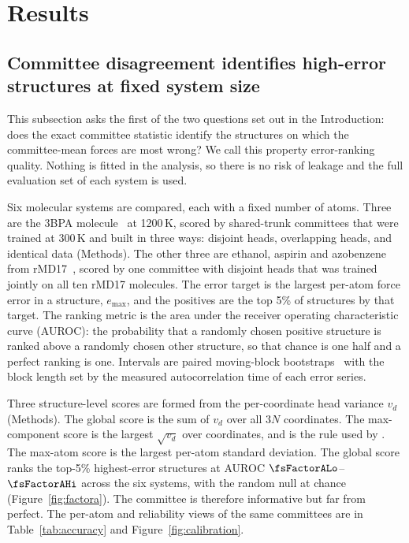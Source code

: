 
\section{Results}
\label{sec:results}


\subsection{Committee disagreement identifies high-error structures at fixed system size}
\label{sec:fixedsize}

This subsection asks the first of the two questions set out in the Introduction:
does the exact committee statistic identify the structures on which the
committee-mean forces are most wrong? We call this property error-ranking
quality. Nothing is fitted in the analysis, so there is no risk of leakage and
the full evaluation set of each system is used.

Six molecular systems are compared, each with a fixed number of atoms. Three are
the 3BPA molecule~\citep{kovacs2021beyond} at 1200\,K, scored by shared-trunk
committees that were trained at 300\,K and built in three ways: disjoint heads,
overlapping heads, and identical data (Methods). The other three are ethanol,
aspirin and azobenzene from rMD17~\citep{christensen2020role}, scored by one
committee with disjoint heads that was trained jointly on all ten rMD17
molecules. The error target is the largest per-atom force error in a structure,
$e_{\max}$, and the positives are the top 5\% of structures by that target. The
ranking metric is the area under the receiver operating characteristic curve
(AUROC): the probability that a randomly chosen positive structure is ranked
above a randomly chosen other structure, so that chance is one half and a
perfect ranking is one. Intervals are paired moving-block
bootstraps~\citep{kunsch1989jackknife} with the block length set by the measured
autocorrelation time of each error series.

Three structure-level scores are formed from the per-coordinate head variance
$v_d$ (Methods). The global score is the sum of $v_d$ over all $3N$ coordinates.
The max-component score is the largest $\sqrt{v_d}$ over coordinates, and is
the rule used by \citet{beck2025committee}. The max-atom score is the largest
per-atom standard deviation. The global score ranks the top-5\% highest-error
structures at AUROC $\fsFactorALo$--$\fsFactorAHi$ across the six systems, with
the random null at chance (Figure~\ref{fig:factora}). The committee is therefore
informative but far from perfect. The per-atom and reliability views of the same
committees are in Table~\ref{tab:accuracy} and Figure~\ref{fig:calibration}.

